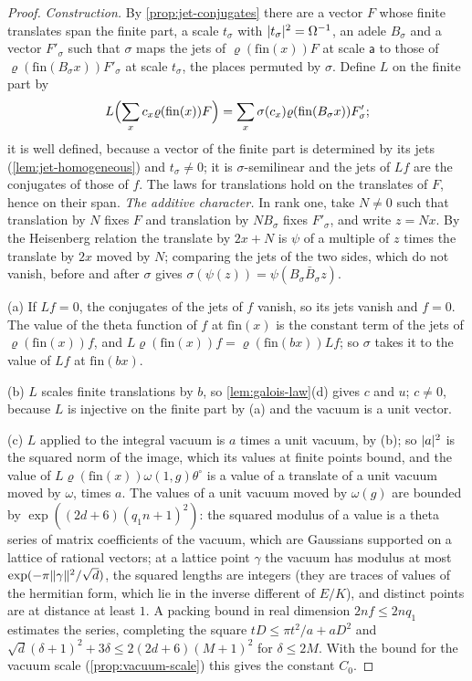 \begin{proof}
\emph{Construction.} By \cref{prop:jet-conjugates} there are a vector $F$ whose finite translates span the finite part, a scale $t_\sigma$ with $\lvert t_\sigma\rvert^2=\Omega^{-1}$, an adele $B_\sigma$ and a vector $F'_\sigma$ such that $\sigma$ maps the jets of $\varrho(\mathrm{fin}(x))F$ at scale $\mathsf a$ to those of $\varrho(\mathrm{fin}(B_\sigma x))F'_\sigma$ at scale
$t_\sigma$, the places permuted by $\sigma$. Define $L$ on the finite part by
\[
  L\Bigl(\sum_xc_x\varrho(\mathrm{fin}(x))F\Bigr)=\sum_x\sigma(c_x)\varrho(\mathrm{fin}(B_\sigma x))F'_\sigma ;
\]
it is well defined, because a vector of the finite part is determined by its jets (\cref{lem:jet-homogeneous}) and $t_\sigma\ne0$; it is $\sigma$-semilinear and the jets of $Lf$ are the conjugates of those of $f$. The laws for translations hold on the translates of $F$, hence on their span. \emph{The additive character.} In rank one, take
$N\ne0$ such that translation by $N$ fixes $F$ and translation by $NB_\sigma$ fixes $F'_\sigma$, and write $z=Nx$. By the Heisenberg relation the translate by $2x+N$ is $\psi$ of a multiple of $z$ times the translate by $2x$ moved by $N$; comparing the jets of the two sides, which do not vanish, before and after $\sigma$ gives
$\sigma(\psi(z))=\psi(B_\sigma\bar B_\sigma z)$.

(a) If $Lf=0$, the conjugates of the jets of $f$ vanish, so its jets vanish and $f=0$. The value of the theta function of $f$ at $\mathrm{fin}(x)$ is the constant term of the jets of $\varrho(\mathrm{fin}(x))f$, and $L\varrho(\mathrm{fin}(x))f=\varrho(\mathrm{fin}(bx))Lf$; so $\sigma$ takes it to the value of $Lf$ at $\mathrm{fin}(bx)$.

(b) $L$ scales finite translations by $b$, so \cref{lem:galois-law}(d) gives $c$ and $u$; $c\ne0$, because $L$ is injective on the finite part by (a) and the vacuum is a unit vector.

(c) $L$ applied to the integral vacuum is $a$ times a unit vacuum, by (b); so $\lvert a\rvert^2$ is the squared norm of the image, which its values at finite points bound, and the value of $L\varrho(\mathrm{fin}(x))\omega(1,g)\theta^\circ$ is a value of a translate of a unit vacuum moved by $\omega$, times $a$. The values of a unit vacuum moved by
$\omega(g)$ are bounded by $\exp((2d+6)(q_1n+1)^2)$: the squared modulus of a value is a theta series of matrix coefficients of the vacuum, which are Gaussians supported on a lattice of rational vectors; at a lattice point $\gamma$ the vacuum has modulus at most $\exp(-\pi\lVert \gamma\rVert^2/\sqrt d)$, the squared lengths are integers (they
are traces of values of the hermitian form, which lie in the inverse different of $E/K$), and distinct points are at distance at least $1$. A packing bound in real dimension $2nf\le2nq_1$ estimates the series, completing the square $tD\le\pi t^2/a+aD^2$ and $\sqrt d(\delta+1)^2+3\delta\le2(2d+6)(M+1)^2$ for $\delta\le2M$. With the
bound for the vacuum scale (\cref{prop:vacuum-scale}) this gives the constant $C_0$.
\end{proof}
